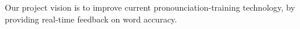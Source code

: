 Our project vision is to improve current pronounciation-training technology, by providing real-time feedback on word accuracy.
